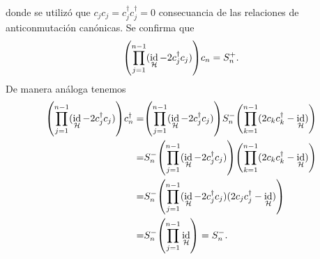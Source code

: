 \documentclass{article}
\DeclareMathOperator{\id}{id}
\begin{document}
donde se utilizó que $c_jc_j=c_j^\dagger c_j^\dagger=0$ consecuancia de las relaciones de anticonmutación canónicas. Se confirma que
\begin{equation}\label{eq:S+}
\qty(\prod_{j=1}^{n-1}(\id_\mathcal{H}-2c_j^\dagger c_j))c_n=S_n^+.
\end{equation}
De manera análoga tenemos
\begin{align}\label{eq:S-}
\begin{split}
\qty(\prod_{j=1}^{n-1}(\id_\mathcal{H}-2c_j^\dagger c_j))c_n^\dagger=&\qty(\prod_{j=1}^{n-1}(\id_\mathcal{H}-2c_j^\dagger c_j))S_n^-\qty(\prod_{k=1}^{n-1}(2c_k c_k^\dagger-\id_\mathcal{H}))\\
=&S_n^-\qty(\prod_{j=1}^{n-1}(\id_\mathcal{H}-2c_j^\dagger c_j))\qty(\prod_{k=1}^{n-1}(2c_k c_k^\dagger-\id_\mathcal{H}))\\
=&S_n^-\qty(\prod_{j=1}^{n-1}(\id_\mathcal{H}-2c_j^\dagger c_j)(2c_j c_j^\dagger-\id_\mathcal{H}))\\
=&S_n^-\qty(\prod_{j=1}^{n-1}\id_\mathcal{H})=S_n^-.
\end{split}
\end{align}
\end{document}
